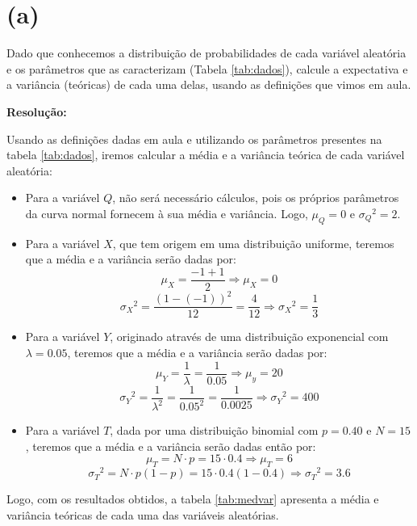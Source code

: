 \documentclass[]{abntex2}
\begin{document}
\section*{\textbf{(a)}}

\noindent Dado que conhecemos a distribuição de probabilidades de cada variável aleatória e os parâmetros que as caracterizam (Tabela \ref{tab:dados}), calcule a expectativa e a variância (teóricas) de cada uma delas, usando as definições que vimos em aula.

\textbf{Resolução:}

Usando as definições dadas em aula e utilizando os parâmetros presentes na tabela \ref{tab:dados}, iremos calcular a média e a variância teórica de cada variável aleatória:

\begin{itemize}
    \item Para a variável $Q$, não será necessário cálculos, pois os próprios parâmetros da curva normal fornecem à sua média e variância. Logo, $\mu_Q = 0$ e ${{\sigma}_Q}^{2} = 2$.
    
    \item Para a variável $X$, que tem origem em uma distribuição uniforme, teremos que a média e a variância serão dadas por:
    \[
    \mu_X = \dfrac{-1+1}{2} \Rightarrow \mu_X = 0
    \]
    \[
    {{\sigma}_X}^{2} = \dfrac{{(1-(-1))}^2}{12}=\dfrac{4}{12} \Rightarrow {{\sigma}_X}^{2} = \dfrac{1}{3}
    \]

    \item Para a variável $Y$, originado através de uma distribuição exponencial com $\lambda=0.05$, teremos que a média e a variância serão dadas por:
    \[
    \mu_Y = \dfrac{1}{\lambda} = \dfrac{1}{0.05} \Rightarrow \mu_y = 20
    \]
    \[
    {{\sigma}_Y}^{2} = \dfrac{1}{\lambda^2} = \dfrac{1}{0.05^2} = \dfrac{1}{0.0025} \Rightarrow {{\sigma}_Y}^{2} = 400
    \]

    \item Para a variável $T$, dada por uma distribuição binomial com $p=0.40$ e $N=15$, teremos que a média e a variância serão dadas então por:
    \[
    \mu_T = N \cdot p = 15 \cdot 0.4 \Rightarrow \mu_T = 6
    \]
    \[
    {{\sigma}_T}^{2} = N\cdot p(1-p)=15 \cdot 0.4(1-0.4) \Rightarrow {{\sigma}_T}^{2} = 3.6
    \]
\end{itemize}

Logo, com os resultados obtidos, a tabela \ref{tab:medvar} apresenta a média e variância teóricas de cada uma das variáveis aleatórias.
\end{document}
